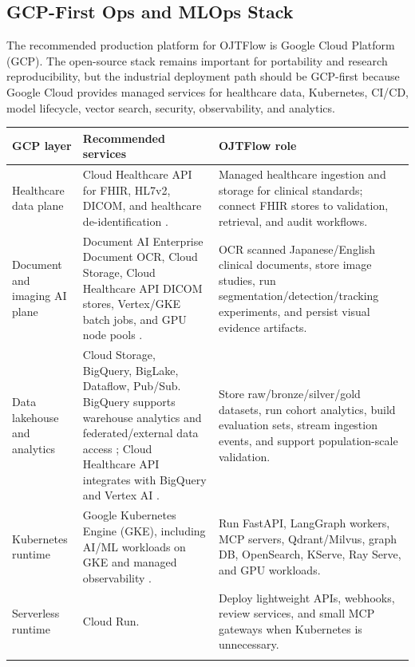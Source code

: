 \subsection{GCP-First Ops and MLOps Stack}

The recommended production platform for OJTFlow is Google Cloud Platform (GCP). The open-source stack remains important for portability and research reproducibility, but the industrial deployment path should be GCP-first because Google Cloud provides managed services for healthcare data, Kubernetes, CI/CD, model lifecycle, vector search, security, observability, and analytics.

\begin{longtable}{p{}p{}p{}}
\toprule
\textbf{GCP layer} & \textbf{Recommended services} & \textbf{OJTFlow role} \\
\midrule
Healthcare data plane & Cloud Healthcare API for FHIR, HL7v2, DICOM, and healthcare de-identification \cite{gcpHealthcare}. & Managed healthcare ingestion and storage for clinical standards; connect FHIR stores to validation, retrieval, and audit workflows. \\
\addlinespace
Document and imaging AI plane & Document AI Enterprise Document OCR, Cloud Storage, Cloud Healthcare API DICOM stores, Vertex/GKE batch jobs, and GPU node pools \cite{gcpDocumentAI,gcpHealthcare}. & OCR scanned Japanese/English clinical documents, store image studies, run segmentation/detection/tracking experiments, and persist visual evidence artifacts. \\
\addlinespace
Data lakehouse and analytics & Cloud Storage, BigQuery, BigLake, Dataflow, Pub/Sub. BigQuery supports warehouse analytics and federated/external data access \cite{bigquery}; Cloud Healthcare API integrates with BigQuery and Vertex AI \cite{gcpHealthcare}. & Store raw/bronze/silver/gold datasets, run cohort analytics, build evaluation sets, stream ingestion events, and support population-scale validation. \\
\addlinespace
Kubernetes runtime & Google Kubernetes Engine (GKE), including AI/ML workloads on GKE and managed observability \cite{gke}. & Run FastAPI, LangGraph workers, MCP servers, Qdrant/Milvus, graph DB, OpenSearch, KServe, Ray Serve, and GPU workloads. \\
\addlinespace
Serverless runtime & Cloud Run. & Deploy lightweight APIs, webhooks, review services, and small MCP gateways when Kubernetes is unnecessary. \\
\addlinespace

\end{longtable}
